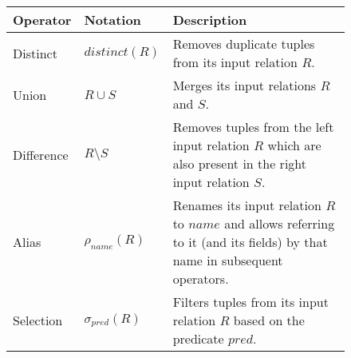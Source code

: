 \begin{figure}[htpb]
	\centering
	\begin{tabular}{@{}p{}p{}p{}@{}}
		\toprule
		Operator           & Notation                                                    & Description                                                                                                                                                                                                                                                                                                       \\
		\midrule
		Distinct           & \(\mathit{distinct}(R)\)                                    & Removes duplicate tuples from its input relation \(R\).                                                                                                                                                                                                                                                           \\
		Union              & \(R \cup S\)                                                & Merges its input relations \(R\) and \(S\).                                                                                                                                                                                                                                                                       \\
		Difference         & \(R \setminus S\)                                           & Removes tuples from the left input relation \(R\) which are also present in the right input relation \(S\).                                                                                                                                                                                                       \\
		Alias              & \(\rho_\mathit{name}(R)\)                                   & Renames its input relation \(R\) to \(\mathit{name}\) and allows referring to it (and its fields) by that name in subsequent operators.                                                                                                                                                                           \\
		Selection          & \(\sigma_{\mathit{pred}}(R)\)                               & Filters tuples from its input relation \(R\) based on the predicate \(\mathit{pred}\).                                                                                                                                                                                                                            \\

\end{tabular}
\end{figure}
